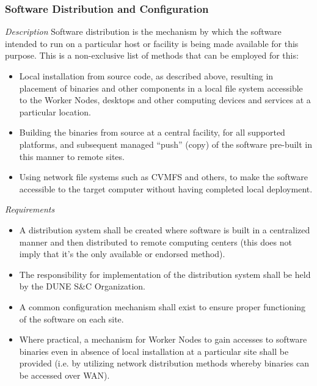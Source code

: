 \subsubsection{Software Distribution and Configuration}
\textit{Description}
Software distribution is the mechanism by which the software intended to run on a particular host or facility is being made available for this purpose. This is a non-exclusive list of methods that can be employed for this:

\begin{itemize}
\item Local installation from source code, as described above, resulting in placement of binaries and other components in a local file system accessible to the Worker Nodes, desktops and other computing devices and services at a particular location.

\item Building the binaries from source at a central facility, for all supported platforms, and subsequent managed ``push'' (copy) of the software pre-built in this manner to remote sites.

\item Using network file systems such as CVMFS and others, to make the software accessible to the target computer without having completed local deployment.
\end{itemize}

\textit{Requirements}
\begin{itemize}
\item A distribution system shall be created where software is built in a centralized manner and then distributed to remote computing centers (this does not imply that it's the only available or endorsed method).

\item The responsibility for implementation of the distribution system shall be held by the DUNE S\&C Organization.

\item A common configuration mechanism shall exist to ensure proper functioning of the software on each site.

\item Where practical, a mechanism for Worker Nodes to gain accesses to software binaries even in absence of local installation at a particular site shall be provided (i.e. by utilizing network distribution methods whereby binaries can be accessed over WAN).

\end{itemize}

